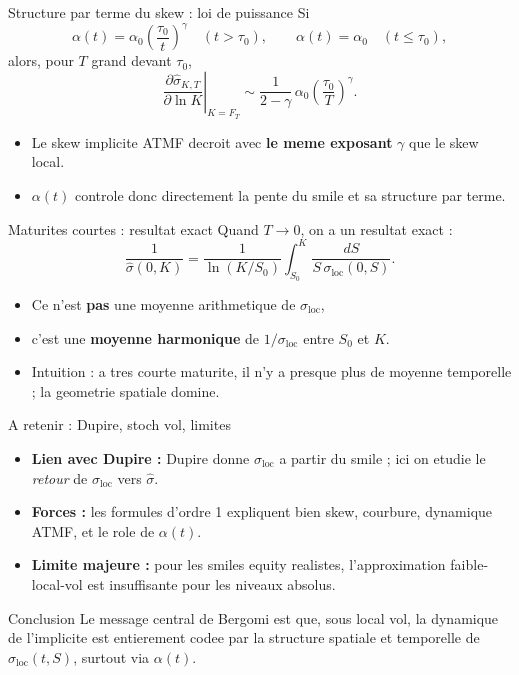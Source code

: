 \begin{frame}{Structure par terme du skew : loi de puissance}
\small
Si
\[
\alpha(t)=\alpha_0\left(\frac{\tau_0}{t}\right)^\gamma
\quad (t>\tau_0),
\qquad
\alpha(t)=\alpha_0
\quad (t\le \tau_0),
\]
alors, pour \(T\) grand devant \(\tau_0\),
\[
\left.\frac{\partial \hat{\sigma}_{K,T}}{\partial \ln K}\right|_{K=F_T}
\sim
\frac{1}{2-\gamma}\,
\alpha_0\left(\frac{\tau_0}{T}\right)^\gamma.
\]

\begin{itemize}
    \item Le skew implicite ATMF decroit avec \textbf{le meme exposant} \(\gamma\) que le skew local.
    \item \(\alpha(t)\) controle donc directement la pente du smile et sa structure par terme.
\end{itemize}
\end{frame}

\begin{frame}{Maturites courtes : resultat exact}
\small
Quand \(T\to 0\), on a un resultat exact :
\[
\frac{1}{\hat{\sigma}(0,K)}
=
\frac{1}{\ln(K/S_0)}
\int_{S_0}^{K}\frac{dS}{S\,\sigma_{\mathrm{loc}}(0,S)}.
\]

\begin{itemize}
    \item Ce n'est \textbf{pas} une moyenne arithmetique de \(\sigma_{\mathrm{loc}}\),
    \item c'est une \textbf{moyenne harmonique} de \(1/\sigma_{\mathrm{loc}}\) entre \(S_0\) et \(K\).
    \item Intuition : a tres courte maturite, il n'y a presque plus de moyenne temporelle ; la geometrie spatiale domine.
\end{itemize}
\end{frame}

\begin{frame}{A retenir : Dupire, stoch vol, limites}
\small
\begin{itemize}
    \item \textbf{Lien avec Dupire :} Dupire donne \(\sigma_{\mathrm{loc}}\) a partir du smile ; ici on etudie le \emph{retour} de \(\sigma_{\mathrm{loc}}\) vers \(\hat{\sigma}\).
    \item \textbf{Forces :} les formules d'ordre 1 expliquent bien skew, courbure, dynamique ATMF, et le role de \(\alpha(t)\).
    \item \textbf{Limite majeure :} pour les smiles equity realistes, l'approximation faible-local-vol est insuffisante pour les niveaux absolus.

\end{itemize}

\vspace{0.2cm}
\begin{block}{Conclusion}
Le message central de Bergomi est que, sous local vol, la dynamique de l'implicite est entierement codee par la structure spatiale et temporelle de \(\sigma_{\mathrm{loc}}(t,S)\), surtout via \(\alpha(t)\).
\end{block}
\end{frame}
